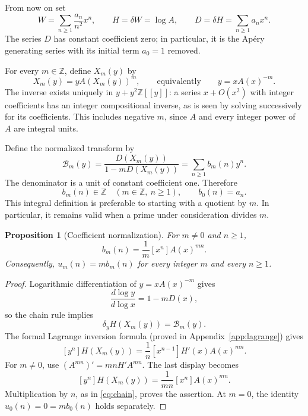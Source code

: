 \documentclass[11pt,letterpaper]{article}
\numberwithin{equation}{section}
\newtheorem{proposition}[theorem]{Proposition}
\theoremstyle{definition}
\newcommand{\Z}{\mathbb Z}
\newcommand{\dd}{\delta}
\newcommand{\Bn}{\mathcal B}
\begin{document}
From now on set
\begin{equation}\label{eq:WHD}
W=\sum_{n\geq1}\frac{a_n}{n^2}x^n,\qquad
H=\dd W=\log A,\qquad
D=\dd H=\sum_{n\geq1}a_nx^n.
\end{equation}
The series $D$ has constant coefficient zero; in particular, it is the
Ap\'ery generating series with its initial term $a_0=1$ removed.

For every $m\in\Z$, define $X_m(y)$ by
\begin{equation}\label{eq:X}
X_m(y)=yA(X_m(y))^m,
\qquad\text{equivalently}\qquad y=xA(x)^{-m}.
\end{equation}
The inverse exists uniquely in $y+y^2\Z[[y]]$: a series
$x+O(x^2)$ with integer coefficients has an integer compositional inverse,
as is seen by solving successively for its coefficients. This includes
negative $m$, since $A$ and every integer power of $A$ are integral units.

Define the normalized transform by
\begin{equation}\label{eq:B-definition}
\Bn_m(y)=\frac{D(X_m(y))}{1-mD(X_m(y))}
        =\sum_{n\geq1}b_m(n)y^n.
\end{equation}
The denominator is a unit of constant coefficient one. Therefore
\begin{equation}\label{eq:B-integer}
b_m(n)\in\Z\quad(m\in\Z,\ n\geq1),
\qquad b_0(n)=a_n.
\end{equation}
This integral definition is preferable to starting with a quotient by
$m$. In particular, it remains valid when a prime under consideration
divides $m$.

\begin{proposition}[Coefficient normalization]\label{prop:B-coefficient}
For $m\neq0$ and $n\geq1$,
\begin{equation}\label{eq:B-coefficient}
b_m(n)=\frac1m[x^n]A(x)^{mn}.
\end{equation}
Consequently, $u_m(n)=m b_m(n)$ for every integer $m$ and every $n\geq1$.
\end{proposition}

\begin{proof}
Logarithmic differentiation of $y=xA(x)^{-m}$ gives
\[
\frac{d\log y}{d\log x}=1-mD(x),
\]
so the chain rule implies
\begin{equation}\label{eq:chain}
\dd_yH(X_m(y))=\Bn_m(y).
\end{equation}
The formal Lagrange inversion formula (proved in
Appendix~\ref{app:lagrange}) gives
\[
[y^n]H(X_m(y))
=\frac1n[x^{n-1}]H'(x)A(x)^{mn}.
\]
For $m\neq0$, use $(A^{mn})'=mn H'A^{mn}$. The last display becomes
\[
[y^n]H(X_m(y))=\frac1{mn}[x^n]A(x)^{mn}.
\]
Multiplication by $n$, as in \eqref{eq:chain}, proves the assertion.
At $m=0$, the identity $u_0(n)=0=m b_0(n)$ holds separately.
\end{proof}
\end{document}

